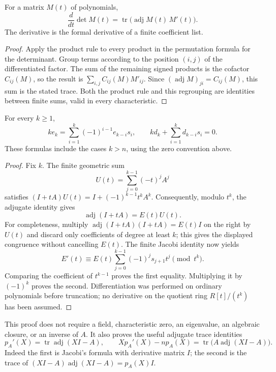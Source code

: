 \begin{proposition}
\label{prop:trace-jacobi}
For a matrix $M(t)$ of polynomials,
\[
 \frac{d}{dt}\det M(t)
 =\operatorname{tr}\bigl(\operatorname{adj} M(t)\,M'(t)\bigr).
\]
The derivative is the formal derivative of a finite coefficient list.
\end{proposition}
\begin{proof}
Apply the product rule to every product in the permutation formula for the
determinant.  Group terms according to the position $(i,j)$ of the
differentiated factor.  The sum of the remaining signed products is the
cofactor $C_{ij}(M)$, so the result is
$\sum_{i,j}C_{ij}(M)M'_{ij}$.  Since
$(\operatorname{adj}M)_{ji}=C_{ij}(M)$, this sum is the stated trace.
Both the product rule and this regrouping are identities between finite
sums, valid in every characteristic.
\end{proof}

\begin{theorem}
\label{thm:trace-newton}
For every $k\geq1$,
\begin{equation}
 k e_k=\sum_{i=1}^{k}(-1)^{i-1}e_{k-i}s_i,
 \qquad
 k d_k+\sum_{i=1}^{k}d_{k-i}s_i=0.
 \label{eq:trace-newton}
\end{equation}
These formulas include the cases $k>n$, using the zero convention above.
\end{theorem}
\begin{proof}
Fix $k$.  The finite geometric sum
\[
 U(t)=\sum_{j=0}^{k-1}(-t)^jA^j
\]
satisfies $(I+tA)U(t)=I+(-1)^{k-1}t^kA^k$.  Consequently, modulo $t^k$,
the adjugate identity gives
\[
 \operatorname{adj}(I+tA)=E(t)U(t).
\]
For completeness, multiply
$\operatorname{adj}(I+tA)(I+tA)=E(t)I$ on the right by $U(t)$ and discard
only coefficients of degree at least $k$; this gives the displayed
congruence without cancelling $E(t)$.  The finite Jacobi identity now yields
\[
 E'(t)\equiv E(t)\sum_{j=0}^{k-1}(-1)^j s_{j+1}t^j\pmod{t^k}.
\]
Comparing the coefficient of $t^{k-1}$ proves the first equality.  Multiplying
it by $(-1)^k$ proves the second.  Differentiation was performed on ordinary
polynomials before truncation; no derivative on the quotient ring
$R[t]/(t^k)$ has been assumed.
\end{proof}

This proof does not require a field, characteristic zero, an eigenvalue, an
algebraic closure, or an inverse of $A$.  It also proves the useful adjugate
trace identities
\begin{equation}
 p_A'(X)=\operatorname{tr}\operatorname{adj}(XI-A),\qquad
 Xp_A'(X)-n p_A(X)
   =\operatorname{tr}\bigl(A\operatorname{adj}(XI-A)\bigr).
 \label{eq:trace-adjugate}
\end{equation}
Indeed the first is Jacobi's formula with derivative matrix $I$; the second
is the trace of
$(XI-A)\operatorname{adj}(XI-A)=p_A(X)I$.

